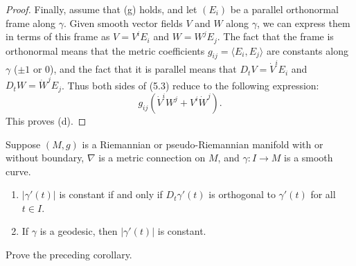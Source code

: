 \begin{proposition}
\begin{proof}
Finally, assume that (g) holds, and let $(E_i)$ be a parallel orthonormal frame along $\gamma$. Given smooth vector fields $V$ and $W$ along $\gamma$, we can express them in terms of this frame as $V = V^i E_i$ and $W = W^j E_j$. The fact that the frame is orthonormal means that the metric coefficients $g_{ij} = \langle E_i, E_j \rangle$ are constants along $\gamma$ ($\pm 1$ or $0$), and the fact that it is parallel means that $D_t V = \dot{V}^i E_i$ and $D_t W = \dot{W}^j E_j$. Thus both sides of (5.3) reduce to the following expression:
\[
g_{ij} (\dot{V}^i W^j + V^i \dot{W}^j).
\]
This proves (d).
\end{proof}
\end{proposition}

\begin{corollary}
\label{cor:metric-connection-norm-geodesic}

Suppose $(M,g)$ is a Riemannian or pseudo-Riemannian manifold with or without boundary, $\nabla$ is a metric connection on $M$, and $\gamma : I \to M$ is a smooth curve.
\begin{enumerate}
\item[(a)] $|\gamma'(t)|$ is constant if and only if $D_t\gamma'(t)$ is orthogonal to $\gamma'(t)$ for all $t \in I$.
\item[(b)] If $\gamma$ is a geodesic, then $|\gamma'(t)|$ is constant.
\end{enumerate}
\end{corollary}

\begin{exercise}
\label{exer:prove-corollary-5-6}

Prove the preceding corollary.
\end{exercise}

